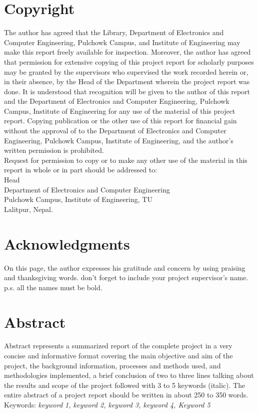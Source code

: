 \documentclass[12pt]{report}
\begin{document}
\chapter*{Copyright}
The author has agreed that the Library, Department of Electronics and Computer Engineering, Pulchowk Campus, and Institute of Engineering may make this report freely available for inspection. Moreover, the author has agreed that permission for extensive copying of this project report for scholarly purposes may be granted by the supervisors who supervised the work recorded herein or, in their absence, by the Head of the Department wherein the project report was done. It is understood that recognition will be given to the author of this report and the Department of Electronics and Computer Engineering, Pulchowk Campus, Institute of Engineering for any use of the material of this project report. Copying publication or the other use of this report for financial gain without the approval of to the Department of Electronics and Computer Engineering, Pulchowk Campus, Institute of Engineering, and the author's written permission is prohibited.\\
Request for permission to copy or to make any other use of the material in this report in whole or in part should be addressed to:\\
\newline
\newline
\newline
Head\\
Department of Electronics and Computer Engineering\\
Pulchowk Campus, Institute of Engineering, TU\\
Lalitpur, Nepal.
\chapter*{Acknowledgments}
On this page, the author expresses his gratitude and concern by using praising and thanksgiving words.  don’t forget to include your project supervisor's name. p.s. all the names must be bold.
\chapter*{Abstract}
Abstract represents a summarized report of the complete project in a very concise and informative format covering the main objective and aim of the project, the background information, processes and methods used, and methodologies implemented, a brief conclusion of two to three lines talking about the results and scope of the project followed with 3 to 5 keywords (italic). The entire abstract of a project report should be written in about 250 to 350 words.\\
\newline
Keywords: \textit{keyword 1, keyword 2, keyword 3, keyword 4, Keyword 5}
\tableofcontents
{}
\listoffigures
{}
\listoftables
{}
\end{document}
